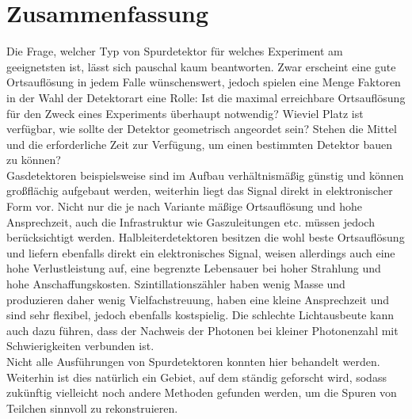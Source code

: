 \documentclass{PoS}
\begin{document}
\section{Zusammenfassung}

Die Frage, welcher Typ von Spurdetektor für welches Experiment am geeignetsten ist, lässt sich
pauschal kaum beantworten. Zwar erscheint eine gute Ortsauflösung in jedem Falle wünschenswert,
jedoch spielen eine Menge Faktoren in der Wahl der Detektorart eine Rolle: Ist die maximal
erreichbare Ortsauflösung für den Zweck eines Experiments überhaupt notwendig? Wieviel Platz ist
verfügbar, wie sollte der Detektor geometrisch angeordet sein? Stehen die Mittel und die
erforderliche Zeit zur Verfügung, um einen bestimmten Detektor bauen zu können?
\\
Gasdetektoren beispielsweise sind im Aufbau verhältnismäßig günstig und können großflächig aufgebaut
werden, weiterhin liegt das Signal direkt in elektronischer Form vor. Nicht nur die je nach Variante
mäßige Ortsauflösung und hohe Ansprechzeit, auch die Infrastruktur wie Gaszuleitungen etc. müssen
jedoch berücksichtigt werden. Halbleiterdetektoren besitzen die wohl beste Ortsauflösung und
liefern ebenfalls direkt ein elektronisches Signal, weisen allerdings auch eine hohe Verlustleistung auf,
eine begrenzte Lebensauer bei hoher Strahlung und hohe Anschaffungskosten. Szintillationszähler
haben wenig Masse und produzieren daher wenig Vielfachstreuung, haben eine kleine Ansprechzeit und
sind sehr flexibel, jedoch ebenfalls kostspielig. Die schlechte Lichtausbeute kann auch dazu führen,
dass der Nachweis der Photonen bei kleiner Photonenzahl mit Schwierigkeiten verbunden ist.
\\
Nicht alle Ausführungen von Spurdetektoren konnten hier behandelt werden. Weiterhin ist dies
natürlich ein Gebiet, auf dem ständig geforscht wird, sodass zukünftig vielleicht noch andere
Methoden gefunden werden, um die Spuren von Teilchen sinnvoll zu rekonstruieren.


% 
\end{document}
